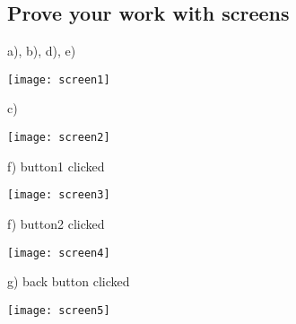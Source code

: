 \subsection{Prove your work with screens}

a), b), d), e)

\texttt{[image: screen1]}

c)

\texttt{[image: screen2]}

f) button1 clicked

\texttt{[image: screen3]}

f) button2 clicked

\texttt{[image: screen4]}

g) back button clicked

\texttt{[image: screen5]}

\clearpage